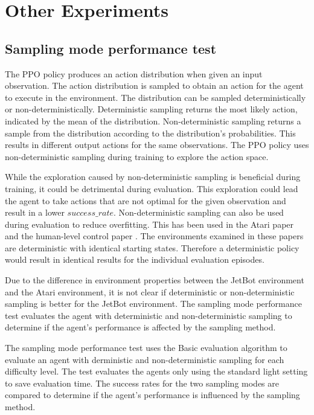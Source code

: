 

\section{Other Experiments}

\subsection{Sampling mode performance test}
\label{sec:deterministic_check}

The PPO policy produces an action distribution when given an input observation. The action distribution is sampled to obtain an action for the agent to execute in the environment. The distribution can be sampled deterministically or non-deterministically. Deterministic sampling returns the most likely action, indicated by the mean of the distribution. Non-deterministic sampling returns a sample from the distribution according to the distribution's probabilities. This results in different output actions for the same observations. The PPO policy uses non-deterministic sampling during training to explore the action space. 

While the exploration caused by non-deterministic sampling is beneficial during training, it could be detrimental during evaluation. This exploration could lead the agent to take actions that are not optimal for the given observation and result in a lower $success\_rate$. Non-deterministic sampling can also be used during evaluation to reduce overfitting. This has been used in the Atari paper \autocite{atari} and the human-level control paper \autocite{human_level_control}. The environments examined in these papers are deterministic with identical starting states. Therefore a deterministic policy would result in identical results for the individual evaluation episodes.

Due to the difference in environment properties between the JetBot environment and the Atari environment, it is not clear if deterministic or non-deterministic sampling is better for the JetBot environment. The sampling mode performance test evaluates the agent with deterministic and non-deterministic sampling to determine if the agent's performance is affected by the sampling method. 

The sampling mode performance test uses the Basic evaluation algorithm to evaluate an agent with derministic and non-deterministic sampling for each difficulty level. The test evaluates the agents only using the standard light setting to save evaluation time. The success rates for the two sampling modes are compared to determine if the agent's performance is influenced by the sampling method.



